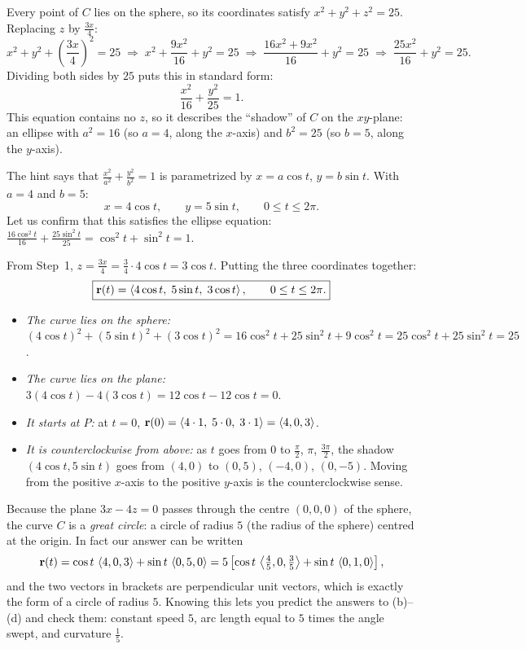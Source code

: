 Every point of $C$ lies on the sphere, so its coordinates satisfy
$x^2+y^2+z^2=25$. Replacing $z$ by $\frac{3x}{4}$:
\[
  x^2+y^2+\left(\frac{3x}{4}\right)^2=25
  \;\Longrightarrow\; x^2+\frac{9x^2}{16}+y^2=25
  \;\Longrightarrow\; \frac{16x^2+9x^2}{16}+y^2=25
  \;\Longrightarrow\; \frac{25x^2}{16}+y^2=25 .
\]
Dividing both sides by $25$ puts this in standard form:
\[
  \frac{x^2}{16}+\frac{y^2}{25}=1 .
\]
This equation contains no $z$, so it describes the ``shadow'' of $C$ on the
$xy$-plane: an ellipse with $a^2=16$ (so $a=4$, along the $x$-axis) and
$b^2=25$ (so $b=5$, along the $y$-axis).

The hint says that $\frac{x^2}{a^2}+\frac{y^2}{b^2}=1$ is parametrized by
$x=a\cos t$, $y=b\sin t$. With $a=4$ and $b=5$:
\[
  x=4\cos t,\qquad y=5\sin t,\qquad 0\le t\le2\pi .
\]
Let us confirm that this satisfies the ellipse equation:
$\frac{16\cos^2t}{16}+\frac{25\sin^2t}{25}=\cos^2t+\sin^2t=1$.\checkok

From Step~1, $z=\frac{3x}{4}=\frac{3}{4}\cdot4\cos t=3\cos t$. Putting the three
coordinates together:
\[
  \boxed{\mathbf{r}(t)=\left\langle 4\cos t,\;5\sin t,\;3\cos t \right\rangle,\qquad0\le t\le2\pi .}
\]

\begin{itemize}
\item \emph{The curve lies on the sphere:}
      $(4\cos t)^2+(5\sin t)^2+(3\cos t)^2=16\cos^2t+25\sin^2t+9\cos^2t
      =25\cos^2t+25\sin^2t=25$.\checkok
\item \emph{The curve lies on the plane:} $3(4\cos t)-4(3\cos t)=12\cos t-12\cos t=0$.\checkok
\item \emph{It starts at $P$:} at $t=0$, $\mathbf{r}(0)=\left\langle 4\cdot1,\;5\cdot0,\;3\cdot1 \right\rangle=\left\langle 4,0,3 \right\rangle$.\checkok
\item \emph{It is counterclockwise from above:} as $t$ goes from $0$ to
      $\frac\pi2$, $\pi$, $\frac{3\pi}{2}$, the shadow $(4\cos t,5\sin t)$ goes from
      $(4,0)$ to $(0,5)$, $(-4,0)$, $(0,-5)$. Moving from the positive $x$-axis to
      the positive $y$-axis is the counterclockwise sense.\checkok
\end{itemize}

\begin{altmethod}
Because the plane $3x-4z=0$ passes through the centre $(0,0,0)$ of the
sphere, the curve $C$ is a \emph{great circle}: a circle of radius $5$ (the
radius of the sphere) centred at the origin. In fact our answer can be written
\[
  \mathbf{r}(t)=\cos t\,\left\langle 4,0,3 \right\rangle+\sin t\,\left\langle 0,5,0 \right\rangle
  =5\left[\cos t\,\left\langle \tfrac45,0,\tfrac35 \right\rangle+\sin t\,\left\langle 0,1,0 \right\rangle\right],
\]
and the two vectors in brackets are perpendicular unit vectors, which is
exactly the form of a circle of radius $5$. Knowing this lets you predict the
answers to (b)--(d) and check them: constant speed $5$, arc length equal to
$5$ times the angle swept, and curvature $\frac15$.
\end{altmethod}

